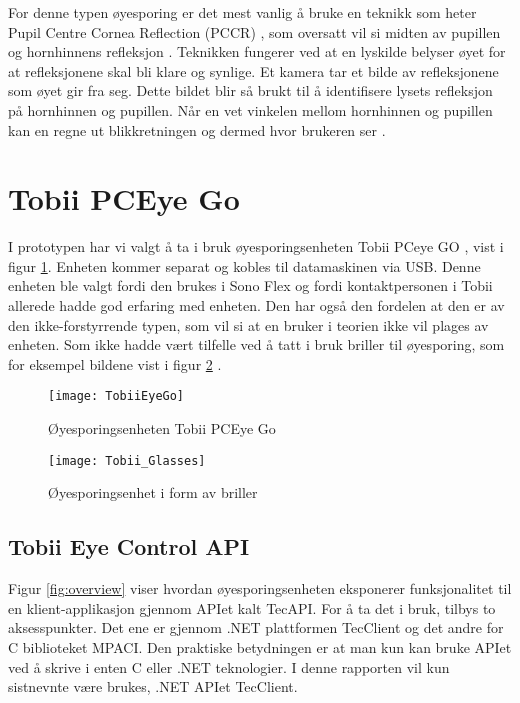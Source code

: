 For denne typen øyesporing er det mest vanlig å bruke en teknikk som heter Pupil Centre Cornea Reflection (\gls{PCCR}) \cite{Calibration}, som oversatt vil si midten av pupillen og hornhinnens refleksjon . Teknikken fungerer ved at en lyskilde belyser øyet for at refleksjonene skal bli klare og synlige. Et kamera tar et bilde av refleksjonene som øyet gir fra seg. Dette bildet blir så brukt til å identifisere lysets refleksjon på hornhinnen og pupillen. Når en vet vinkelen mellom hornhinnen og pupillen kan en regne ut blikkretningen og dermed hvor brukeren ser \cite{Calibration}.



\section{Tobii PCEye Go}

I prototypen har vi valgt å ta i bruk øyesporingsenheten Tobii PCeye GO \cite{Contr4:online}, vist i figur \ref{fig:tobiiPc}. Enheten kommer separat og kobles til datamaskinen via USB. Denne enheten ble valgt fordi den brukes i Sono Flex og fordi kontaktpersonen i Tobii allerede hadde god erfaring med enheten. Den har også den fordelen at den er av den ikke-forstyrrende typen, som vil si at en bruker i teorien ikke vil plages av enheten. Som ikke hadde vært tilfelle ved å tatt i bruk briller til øyesporing, som for eksempel  bildene vist i figur \ref{fig:tobii_glasses} .

\begin{figure}[ht!]
\centering
\texttt{[image: TobiiEyeGo]}
\caption{Øyesporingsenheten Tobii PCEye Go}
\label{fig:tobiiPc}
\end{figure}

\begin{figure}[ht!]
\centering
\texttt{[image: Tobii\_Glasses]}
\caption{Øyesporingsenhet i form av briller}
\label{fig:tobii_glasses}
\end{figure}


\subsection{Tobii Eye Control API }

Figur \ref{fig:overview} viser hvordan øyesporingsenheten eksponerer funksjonalitet til en klient-applikasjon gjennom APIet kalt TecAPI. For å ta det i bruk, tilbys to aksesspunkter. Det ene er gjennom .NET plattformen TecClient og det andre for C biblioteket MPACI.  Den praktiske betydningen er at man kun kan bruke APIet ved å skrive i enten C eller .NET teknologier. I denne rapporten vil kun sistnevnte være brukes, .NET APIet TecClient. 


